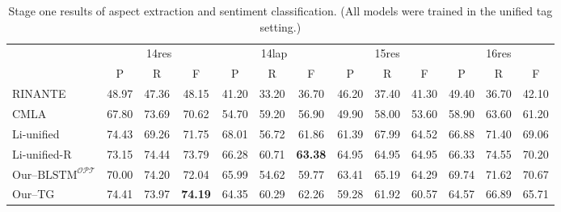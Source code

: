 \documentclass[letterpaper]{article} \usepackage{aaai20}  \usepackage{times}  \usepackage{helvet} \usepackage{courier}  \usepackage[hyphens]{url}  \usepackage{graphicx} \urlstyle{rm} \def\UrlFont{\rm}  \usepackage{graphicx}  \frenchspacing  \setlength{\pdfpagewidth}{8.5in}  \setlength{\pdfpageheight}{11in}
\begin{document}
\begin{table*}[t]
\caption{Stage one results of aspect extraction and sentiment classification.  (All models were trained in the unified tag setting.) }
\label{tab:stage1_ts}
\centering
\begin{small}
\begin{tabular}{l|ccc|ccc|ccc|ccc}
\hline
               & \multicolumn{3}{c|}{14res}                       & \multicolumn{3}{c|}{14lap}                       & \multicolumn{3}{c|}{15res}                       & \multicolumn{3}{c}{16res}                        \\ \cline{2-13} 
                                   & P              & R              & F              & P              & R              & F              & P              & R              & F              & P              & R              & F              \\ \hline
RINANTE                            & 48.97          & 47.36          & 48.15          & 41.20          & 33.20          & 36.70          & 46.20          & 37.40          & 41.30          & 49.40          & 36.70          & 42.10          \\
CMLA                               & 67.80              & 73.69              & 70.62              & 54.70              & 59.20              & 56.90              & 49.90              & 58.00              & 53.60              & 58.90              & 63.60              & 61.20              \\
Li-unified                         & 74.43          & 69.26          & 71.75          & 68.01 & 56.72          & 61.86          & 61.39          & 67.99 & 64.52          & 66.88          & 71.40          & 69.06          \\
Li-unified-R                       & 73.15          & 74.44          & 73.79          & 66.28          & 60.71          & \textbf{63.38} & 64.95          & 64.95          & 64.95          & 66.33          & 74.55 & 70.20          \\ \hline
Our--$\text{BLSTM}^{\mathcal{OPT}}$ & 70.00          & 74.20          & 72.04 & 65.99          & 54.62          & 59.77          & 63.41          & 65.19 & 64.29          & 69.74          & 71.62          & 70.67          \\
Our--TG                             & 74.41 & 73.97          & \textbf{74.19}          & 64.35          & 60.29          & 62.26          & 59.28          & 61.92          & 60.57          & 64.57          & 66.89          & 65.71          \\

\end{tabular}
\end{small}
\end{table*}
\end{document}
